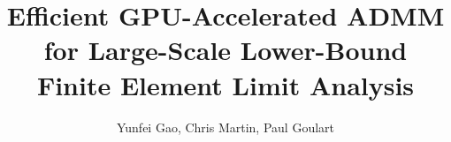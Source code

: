 \documentclass[preprint,12pt]{elsarticle}
\begin{document}
\begin{frontmatter}



\title{Efficient GPU-Accelerated ADMM for Large-Scale Lower-Bound Finite Element Limit Analysis}


\author{Yunfei Gao, Chris Martin, Paul Goulart} %


\begin{abstract}



\end{abstract}
\end{frontmatter}
\end{document}
